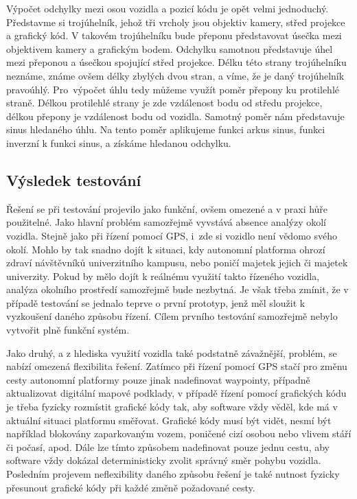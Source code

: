 \documentclass[czech, bachelor]{diploma}
\begin{document}
Výpočet odchylky mezi osou vozidla a pozicí kódu je opět velmi jednoduchý. Představme si trojúhelník, jehož tři vrcholy jsou
objektiv kamery, střed projekce a grafický kód. V takovém trojúhelníku bude přeponu představovat úsečka mezi objektivem kamery
a grafickým bodem. Odchylku samotnou představuje úhel mezi přeponou a úsečkou spojující střed projekce. Délku této strany
trojúhelníku neznáme, známe ovšem délky zbylých dvou stran, a víme, že je daný trojúhelník pravoúhlý. Pro~výpočet úhlu tedy můžeme
využít poměr přepony ku protilehlé straně. Délkou protilehlé strany je zde vzdálenost bodu od středu projekce, délkou přepony
je vzdálenost bodu od vozidla. Samotný poměr nám představuje sinus hledaného úhlu. Na tento poměr aplikujeme funkci arkus sinus,
funkci inverzní k funkci sinus, a získáme hledanou odchylku.

\subsection{Výsledek testování}

Řešení se při testování projevilo jako funkční, ovšem omezené a v praxi hůře použitelné. Jako hlavní problém samozřejmě vyvstává
absence analýzy okolí vozidla. Stejně jako při řízení pomocí GPS, i~zde si vozidlo není vědomo svého okolí. Mohlo by tak snadno
dojít k situaci, kdy autonomní platforma ohrozí zdraví návštěvníků univerzitního kampusu, nebo poničí majetek jejich či majetek
univerzity. Pokud by mělo dojít k reálnému využití takto řízeného vozidla, analýza okolního prostředí samozřejmě bude nezbytná.
Je však třeba zmínit, že v případě testování se jednalo teprve o první prototyp, jenž měl sloužit k vyzkoušení daného způsobu
řízení. Cílem prvního testování samozřejmě nebylo vytvořit plně funkční systém.

Jako druhý, a z hlediska využití vozidla také podstatně závažnější, problém, se nabízí omezená flexibilita řešení. Zatímco při
řízení pomocí GPS stačí pro změnu cesty autonomní platformy pouze jinak nadefinovat waypointy, případně aktualizovat digitální
mapové podklady, v případě řízení pomocí grafických kódu je třeba fyzicky rozmístit grafické kódy tak, aby software vždy věděl,
kde má v aktuální situaci platformu směřovat. Grafické kódy musí být vidět, nesmí být například blokovány zaparkovaným vozem,
poničené cizí osobou nebo vlivem stáří či počasí, apod. Dále lze tímto způsobem nadefinovat pouze jednu cestu, aby software vždy
dokázal deterministicky zvolit správný směr pohybu vozidla. Posledním projevem neflexibility daného způsobu řešení je také nutnost
fyzicky přesunout grafické kódy při každé změně požadované cesty.
\end{document}
